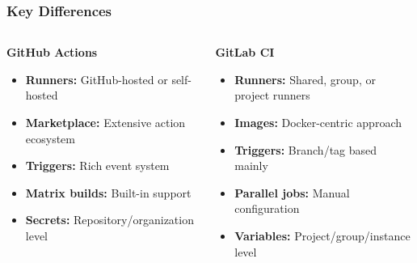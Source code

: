 \begin{frame}
	\frametitle{Key Differences}
	\begin{columns}
		\begin{column}{0.5\textwidth}
			\textbf{GitHub Actions}
			\begin{itemize}
				\item \textbf{Runners:} GitHub-hosted or self-hosted
				\item \textbf{Marketplace:} Extensive action ecosystem
				\item \textbf{Triggers:} Rich event system
				\item \textbf{Matrix builds:} Built-in support
				\item \textbf{Secrets:} Repository/organization level
			\end{itemize}
		\end{column}
		\begin{column}{0.5\textwidth}
			\textbf{GitLab CI}
			\begin{itemize}
				\item \textbf{Runners:} Shared, group, or project runners
				\item \textbf{Images:} Docker-centric approach
				\item \textbf{Triggers:} Branch/tag based mainly
				\item \textbf{Parallel jobs:} Manual configuration
				\item \textbf{Variables:} Project/group/instance level
			\end{itemize}
		\end{column}
	\end{columns}
\end{frame}

